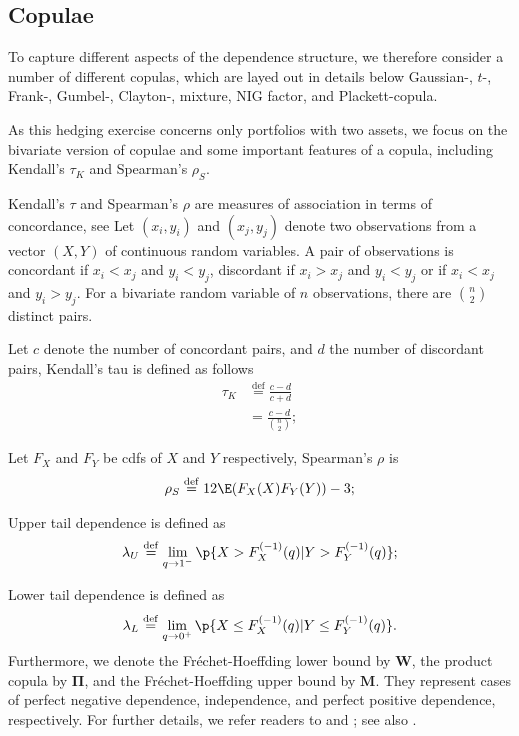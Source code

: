 
\subsection{Copulae}\label{subsec:copulae}
To capture different aspects of the dependence structure, we
  therefore consider a number of different copulas, which are layed
  out in details below \medskip
Gaussian-, $t$-, Frank-,
Gumbel-, Clayton-, mixture, NIG factor, and Plackett-copula. \medskip

As this hedging exercise concerns only portfolios with two assets, we
focus on the bivariate version of copulae and some important
features of a copula, including Kendall's $\tau_K$ and Spearman's $\rho_S$. \medskip

Kendall's $\tau$ and Spearman's $\rho$ are measures of association in terms of concordance, see \cite{kruskal1958ordinal}
Let $(x_i, y_i)$ and $(x_j, y_j)$ denote two observations from a vector $(X, Y)$ of continuous random variables.
A pair of observations is concordant if $x_i<x_j$ and $y_i < y_j$, discordant if
$x_i>x_j$ and $y_i < y_j$ or if $x_i<x_j$ and $y_i>y_j$.
For a bivariate random variable of $n$ observations, there are $\binom{n}{2}$ distinct pairs. \medskip

Let $c$ denote the number of concordant pairs, and $d$ the number of discordant pairs,
Kendall's tau is defined as follows \citep{Nelsen1999}
\begin{align*}
\tau_K &\overset{\mathrm{def}}{=} \frac{c-d}{c+d} \\[10pt]
     &= \frac{c-d}{\binom{n}{2}};
\end{align*}

Let $F_X$ and $F_Y$ be cdfs of $X$ and $Y$ respectively, Spearman's $\rho$ is
\begin{align*}
\rho_S \overset{\mathrm{def}}{=} 12\E (F_X(X)F_Y(Y))-3;
\end{align*}

Upper tail dependence is defined as
\begin{equation*}
\lambda_U \overset{\mathrm{def}}{=}  \lim_{q
  \rightarrow 1^-} \p\{X > F_{X}^{(-1)}(q)|Y > F_{Y}^{(-1)}(q)\};
\end{equation*}

Lower tail dependence is defined as
\begin{equation*}
\lambda_L \overset{\mathrm{def}}{=}  \lim_{q
  \rightarrow 0^+} \p\{X \leq F_{X}^{(-1)}(q)|Y \leq
F_{Y}^{(-1)}(q)\}. 
\end{equation*}
Furthermore, we denote the Fr{\'e}chet-Hoeffding lower bound by
$\bm{W}$, the product copula by $\bm{\Pi}$, and the Fr{\'e}chet-Hoeffding
upper bound by $\bm{M}$. They represent cases of perfect negative
dependence, independence, and perfect positive dependence,
respectively. 
For further details, we refer readers to \citet{joe1997multivariate}
and \citet{Nelsen1999}; see also \citet{hardle2010copulis}. \medskip

